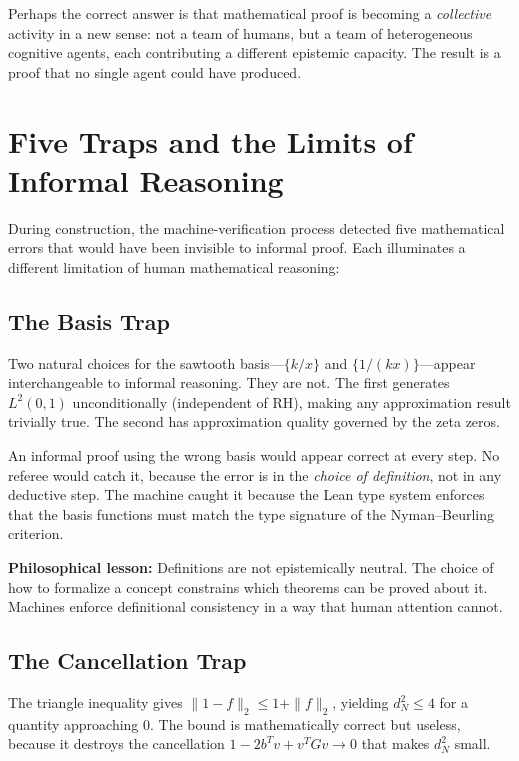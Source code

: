 \documentclass[11pt,a4paper]{article}
\newcommand{\RH}{\ensuremath{\mathrm{RH}}}
\begin{document}
Perhaps the correct answer is that mathematical proof is becoming
a \emph{collective} activity in a new sense: not a team of humans,
but a team of heterogeneous cognitive agents, each contributing a
different epistemic capacity. The result is a proof that no single
agent could have produced.

\section{Five Traps and the Limits of Informal Reasoning}
\label{sec:traps}

During construction, the machine-verification process detected five
mathematical errors that would have been invisible to informal proof.
Each illuminates a different limitation of human mathematical
reasoning:

\subsection{The Basis Trap}

Two natural choices for the sawtooth basis---$\{k/x\}$ and
$\{1/(kx)\}$---appear interchangeable to informal reasoning.
They are not. The first generates $L^2(0,1)$ unconditionally
(independent of \RH), making any approximation result trivially
true. The second has approximation quality governed by the zeta zeros.

An informal proof using the wrong basis would appear correct at
every step. No referee would catch it, because the error is in the
\emph{choice of definition}, not in any deductive step. The machine
caught it because the Lean type system enforces that the basis
functions must match the type signature of the Nyman--Beurling
criterion.

\textbf{Philosophical lesson:} Definitions are not epistemically
neutral. The choice of how to formalize a concept constrains which
theorems can be proved about it. Machines enforce definitional
consistency in a way that human attention cannot.

\subsection{The Cancellation Trap}

The triangle inequality gives $\|1 - f\|_2 \leq 1 + \|f\|_2$,
yielding $d_N^2 \leq 4$ for a quantity approaching 0. The bound is
mathematically correct but useless, because it destroys the
cancellation $1 - 2b^Tv + v^TGv \to 0$ that makes $d_N^2$ small.
\end{document}
